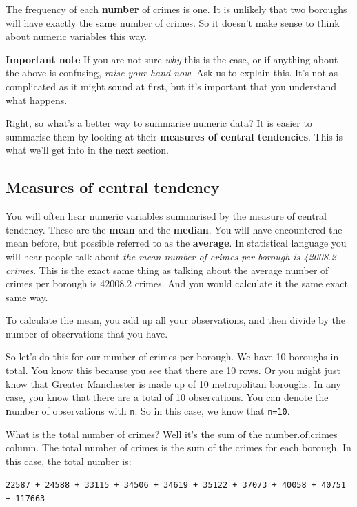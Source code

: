\documentclass[
]{book}
\begin{document}
The frequency of each \textbf{number} of crimes is one. It is unlikely that two boroughs will have exactly the same number of crimes. So it doesn't make sense to think about numeric variables this way.

\textbf{Important note} If you are not sure \emph{why} this is the case, or if anything about the above is confusing, \emph{raise your hand now}. Ask us to explain this. It's not as complicated as it might sound at first, but it's important that you understand what happens.

Right, so what's a better way to summarise numeric data? It is easier to summarise them by looking at their \textbf{measures of central tendencies}. This is what we'll get into in the next section.

\hypertarget{measures-of-central-tendency}{%
\subsection{Measures of central tendency}\label{measures-of-central-tendency}}

You will often hear numeric variables summarised by the measure of central tendency. These are the \textbf{mean} and the \textbf{median}. You will have encountered the mean before, but possible referred to as the \textbf{average}. In statistical language you will hear people talk about \emph{the mean number of crimes per borough is 42008.2 crimes}. This is the exact same thing as talking about the average number of crimes per borough is 42008.2 crimes. And you would calculate it the same exact same way.

To calculate the mean, you add up all your observations, and then divide by the number of observations that you have.

So let's do this for our number of crimes per borough. We have 10 boroughs in total. You know this because you see that there are 10 rows. Or you might just know that \href{https://www.britannica.com/place/Greater-Manchester}{Greater Manchester is made up of 10 metropolitan boroughs}. In any case, you know that there are a total of 10 observations. You can denote the \textbf{n}umber of observations with \texttt{n}. So in this case, we know that \texttt{n=10}.

What is the total number of crimes? Well it's the sum of the number.of.crimes column. The total number of crimes is the sum of the crimes for each borough. In this case, the total number is:

\texttt{22587\ +\ 24588\ +\ 33115\ +\ 34506\ +\ 34619\ +\ 35122\ +\ 37073\ +\ 40058\ +\ 40751\ +\ 117663}
\end{document}
